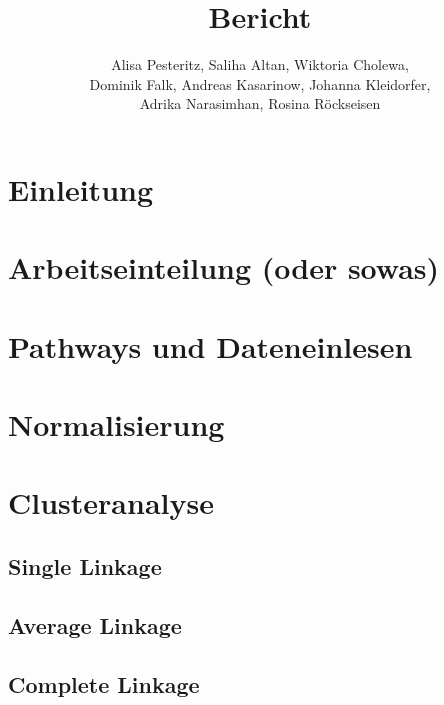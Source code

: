 \documentclass[12pt]{article}
\title{Bericht}
\author{Alisa Pesteritz, Saliha Altan, Wiktoria Cholewa, \\ 
	Dominik Falk, Andreas Kasarinow, Johanna Kleidorfer, \\
	Adrika Narasimhan, Rosina Röckseisen}
\begin{document}
\newpage
\maketitle

\newpage
\pagestyle{fancy}
\fancyhead{}
\section{Einleitung}
\label{einleitung}

\section{Arbeitseinteilung (oder sowas)}
\label{arbeitseinteilung}

\newpage
\pagestyle{fancy}
\fancyhead{}
\section{Pathways und Dateneinlesen}
\label{pathways}

\newpage
\pagestyle{fancy}
\fancyhead{}
\section{Normalisierung}
\label{normalisierung}


\section{Clusteranalyse}
\label{clusteranalyse}

\subsection{Single Linkage}
\label{single-linkage}

\subsection{Average Linkage}
\label{average-linkage}

\subsection{Complete Linkage}
\label{complete-linkage}
\end{document}
